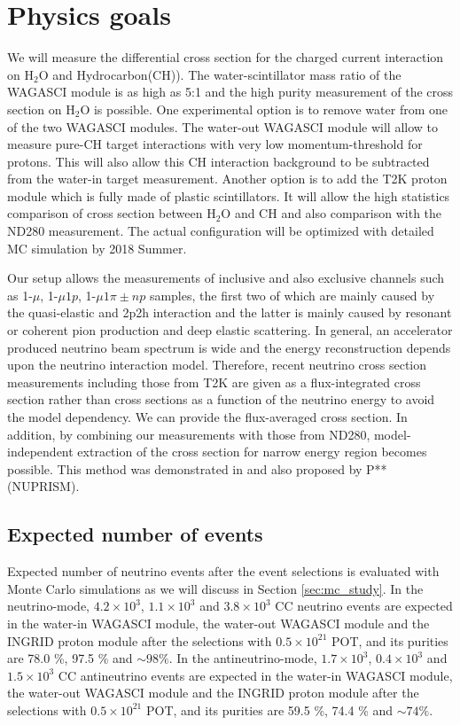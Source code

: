 \section{Physics goals}
We will measure the differential cross section for the charged current interaction on $\mathrm{H_2O}$ and Hydrocarbon(CH)).
The water-scintillator mass ratio of the WAGASCI module is as high as 5:1 and the high purity measurement
of the cross section on $\mathrm{H_2O}$ is possible.
One experimental option is to remove water from one of the two WAGASCI modules. 
The water-out WAGASCI module will allow to measure pure-CH target interactions with very low momentum-threshold for protons.
This will also allow this CH interaction background to be subtracted from the water-in target measurement.
Another option is to add the T2K proton module which is fully made of plastic scintillators.
It will allow the high statistics comparison of cross section between $\mathrm{H_2O}$ and CH and also comparison
with the ND280 measurement. 
The actual configuration will be optimized with detailed MC simulation by 2018 Summer.


Our setup allows the measurements of inclusive and also exclusive channels such as
1-$\mu$, 1-$\mu 1p$, 1-$\mu 1\pi{\pm} np$ samples, the first two of which are mainly caused by the quasi-elastic and
2p2h interaction and the latter is mainly caused by resonant or coherent pion production and deep elastic scattering.
In general, an accelerator produced neutrino beam spectrum is wide and the energy reconstruction
depends upon the neutrino interaction model.
Therefore, recent neutrino cross section measurements including those from T2K are given
as a flux-integrated cross section rather than cross sections as a function of the neutrino energy to avoid the model dependency.
We can provide the flux-averaged cross section.
In addition, by combining our measurements with those from ND280, model-independent extraction of the cross section
for narrow energy region becomes possible.
This method was demonstrated in \cite{Abe:2015biq} and also proposed by P** (NUPRISM).


\subsection{Expected number of events}
Expected number of neutrino events after the event selections is evaluated with Monte Carlo simulations as we will discuss in Section \ref{sec:mc_study}.
In the neutrino-mode, $4.2 \times 10^{3}$, $1.1 \times 10^{3}$ and $3.8 \times 10^{3}$ CC neutrino events are expected in the water-in WAGASCI module, the water-out WAGASCI module and the INGRID proton module after the selections with $0.5\times 10^{21}$ POT, and its purities are 78.0 \%, 97.5 \% and $\sim 98 \%$.
In the antineutrino-mode, $1.7 \times 10^{3}$, $0.4 \times 10^{3}$ and $1.5 \times 10^{3}$ CC antineutrino events are expected in the water-in WAGASCI module, the water-out WAGASCI module and the INGRID proton module after the selections with $0.5\times 10^{21}$ POT, and its purities are 59.5 \%, 74.4 \% and $\sim 74 \%$.


